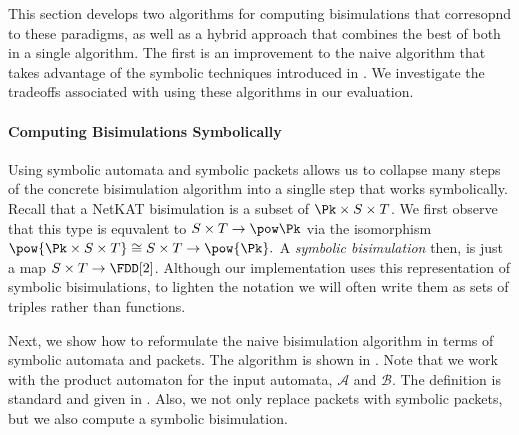 This section develops two
algorithms for computing bisimulations that corresopnd to these
paradigms, as well as a hybrid approach that combines the best of both
in a single algorithm. The first is an improvement to the naive
algorithm that takes advantage of the symbolic techniques introduced
in . We investigate the tradeoffs associated with
using these algorithms in our evaluation.

\paragraph*{Computing Bisimulations Symbolically}\label{sec:fwd-sym}

Using symbolic automata and symbolic packets allows us to collapse
many steps of the concrete bisimulation algorithm into a singlle step
that works symbolically. Recall that a NetKAT bisimulation is a subset
of $\Pk \times S \times T$. We first observe that this type is
equvalent to $S\times T \to \pow \Pk$ via the isomorphism $\pow{\Pk
  \times S \times T} \cong S \times T \to \pow{\Pk}.$ A {\em symbolic
  bisimulation} then, is just a map $S \times T \to \FDD[2]$. Although
our implementation uses this representation of symbolic bisimulations,
to lighten the notation we will often write them as sets of triples
rather than functions.

Next, we show how to reformulate the naive bisimulation algorithm in
terms of symbolic automata and packets. The algorithm is shown in
. Note that we work with the product automaton for
the input automata, $\mathcal{A}$ and $\mathcal{B}$. The definition is
standard and given in . Also, we not only replace
packets with symbolic packets, but we also compute a symbolic
bisimulation.

